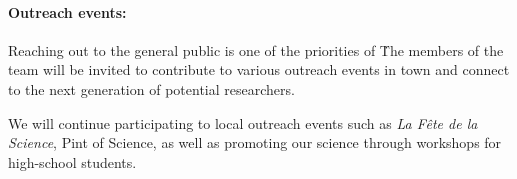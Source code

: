 \paragraph{Outreach events:}
Reaching out to the general public is one of the priorities of 
\projacro\. The members of the team will be invited to 
contribute to various outreach events in town and connect to 
the next generation of potential researchers. 

We will continue participating to local outreach events such as  
\emph{La Fête de la Science}, Pint of Science, as well as 
promoting our science through workshops for high-school students. 


